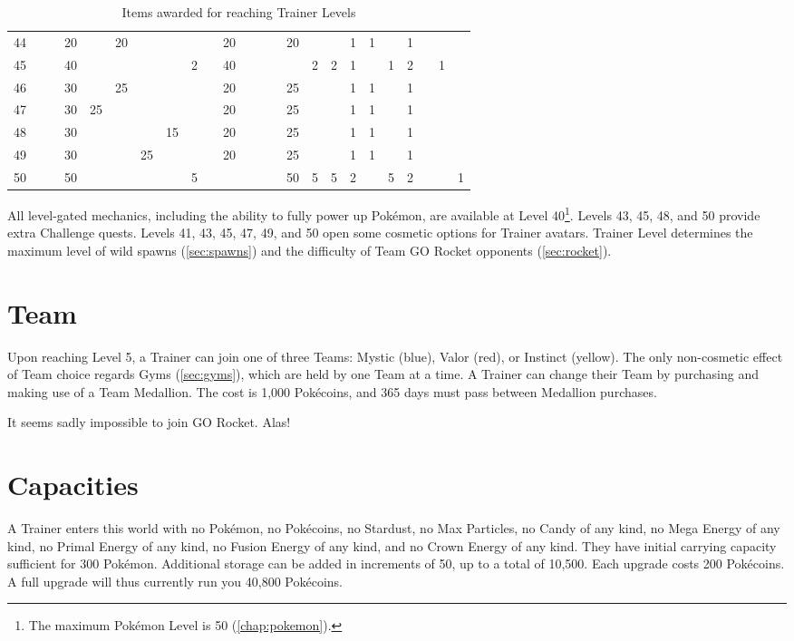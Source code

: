 \begin{table}[h!]
\begin{tabular}{r|g c g c g c g c g c g c g c g c g c g c g c g}
  44 &    &    & 20 &    & 20 &    &    &   &    & 20 &    &    &    & 20 &   &   & 1  & 1 &   & 1 &   &   &   \\
  45 &    &    & 40 &    &    &    &    & 2 &    & 40 &    &    &    &    & 2 & 2 & 1  &   & 1 & 2 &   & 1 &   \\
  46 &    &    & 30 &    & 25 &    &    &   &    & 20 &    &    &    & 25 &   &   & 1  & 1 &   & 1 &   &   &   \\
  47 &    &    & 30 & 25 &    &    &    &   &    & 20 &    &    &    & 25 &   &   & 1  & 1 &   & 1 &   &   &   \\
  48 &    &    & 30 &    &    &    & 15 &   &    & 20 &    &    &    & 25 &   &   & 1  & 1 &   & 1 &   &   &   \\
  49 &    &    & 30 &    &    & 25 &    &   &    & 20 &    &    &    & 25 &   &   & 1  & 1 &   & 1 &   &   &   \\
  50 &    &    & 50 &    &    &    &    & 5 &    &    &    &    &    & 50 & 5 & 5 & 2  &   & 5 & 2 &   &   & 1 \\
\end{tabular}
\caption{Items awarded for reaching Trainer Levels}
\label{table:levelitems}
\end{table}
All level-gated mechanics, including the ability to fully power up Pokémon,
 are available at Level 40\footnote{The maximum Pokémon Level is 50 (\autoref{chap:pokemon}).}.
Levels 43, 45, 48, and 50 provide extra Challenge quests.
Levels 41, 43, 45, 47, 49, and 50 open some cosmetic options for Trainer avatars.
Trainer Level determines the maximum level of wild spawns
  (\autoref{sec:spawns}) and the difficulty of Team GO Rocket
  opponents (\autoref{sec:rocket}).

\section{Team}
Upon reaching Level 5, a Trainer can join one of three Teams: Mystic (blue),
  Valor (red), or Instinct (yellow).
The only non-cosmetic effect of Team choice regards Gyms (\autoref{sec:gyms}), which
  are held by one Team at a time.
A Trainer can change their Team by purchasing and making use of a Team Medallion.
The cost is 1,000 Pokécoins, and 365 days must pass between Medallion purchases.

It seems sadly impossible to join GO Rocket. Alas!

\section{Capacities}
\label{sec:capacities}
A Trainer enters this world with no Pokémon, no Pokécoins, no Stardust,
  no Max Particles, no Candy of any kind, no Mega Energy of any kind,
  no Primal Energy of any kind, no Fusion Energy of any kind, and no Crown
  Energy of any kind.
They have initial carrying capacity sufficient for 300 Pokémon.
Additional storage can be added in increments of 50, up to a total of 10,500.
Each upgrade costs 200 Pokécoins.
A full upgrade will thus currently run you 40,800 Pokécoins.

